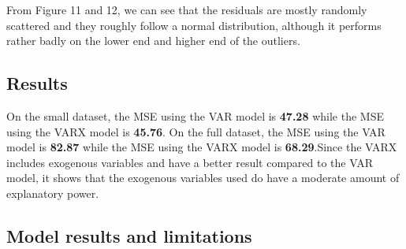 \documentclass[nonblindrev,msom]{informs3} %
\begin{document}
\noindent From Figure 11 and 12, we can see that the residuals are mostly randomly scattered and they roughly follow a normal distribution, although it performs rather badly on the lower end and higher end of the outliers. 


%
%
%

\subsection{Results}
On the small dataset, the MSE using the VAR model is \textbf{47.28} while the MSE using the VARX model is \textbf{45.76}. On the full dataset, the MSE using the VAR model  is \textbf{82.87} while the MSE using the VARX model is \textbf{68.29}.Since the VARX includes exogenous variables and have a better result compared to the VAR model, it shows that the exogenous variables used do have a moderate amount of explanatory power. 

\subsection{Model results and limitations}
\end{document}
